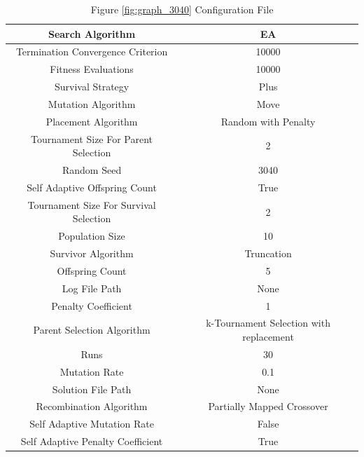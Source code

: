 \documentclass{standalone}
\begin{document}
\begin{table}[!htb]
	\centering
	\caption{Figure \ref{fig:graph_3040} Configuration File}
	\label{tab:graph_3040}
	\begin{tabular}{| c | c |}
		\hline
		Search Algorithm		& EA		 \\
		\hline
		Termination Convergence Criterion		& 10000		 \\
		\hline
		Fitness Evaluations		& 10000		 \\
		\hline
		Survival Strategy		& Plus		 \\
		\hline
		Mutation Algorithm		& Move		 \\
		\hline
		Placement Algorithm		& Random with Penalty		 \\
		\hline
		Tournament Size For Parent Selection		& 2		 \\
		\hline
		Random Seed		& 3040		 \\
		\hline
		Self Adaptive Offspring Count		& True		 \\
		\hline
		Tournament Size For Survival Selection		& 2		 \\
		\hline
		Population Size		& 10		 \\
		\hline
		Survivor Algorithm		& Truncation		 \\
		\hline
		Offspring Count		& 5		 \\
		\hline
		Log File Path		& None		 \\
		\hline
		Penalty Coefficient		& 1		 \\
		\hline
		Parent Selection Algorithm		& k-Tournament Selection with replacement		 \\
		\hline
		Runs		& 30		 \\
		\hline
		Mutation Rate		& 0.1		 \\
		\hline
		Solution File Path		& None		 \\
		\hline
		Recombination Algorithm		& Partially Mapped Crossover		 \\
		\hline
		Self Adaptive Mutation Rate		& False		 \\
		\hline
		Self Adaptive Penalty Coefficient		& True		 \\
		\hline
	\end{tabular}
\end{table}
\end{document}

